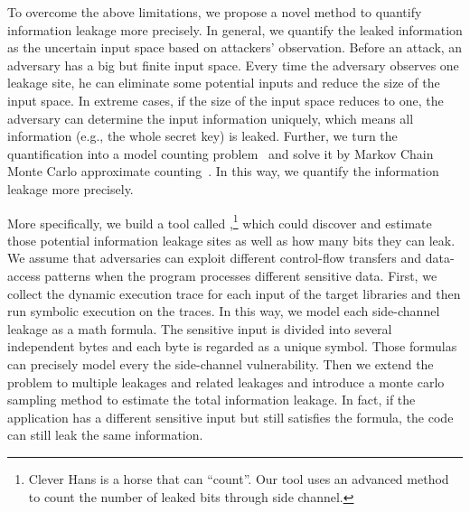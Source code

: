 To overcome the above limitations, we propose a novel method
to quantify information leakage more precisely. 
In general, we quantify the leaked information as the uncertain input space based on attackers' observation.
Before an attack, an adversary has a big but finite input space.
Every time the adversary observes one leakage site, he can eliminate some potential inputs and
reduce the size of the input space. 
In extreme cases, if the size of the input space reduces to one, 
the adversary can determine the input information uniquely, which means all information
(e.g., the whole secret key) is leaked. 
Further, we turn the quantification into a model counting problem~\cite{bibid} 
and solve it by Markov Chain Monte Carlo approximate counting~\cite{bibid}. 
In this way, we quantify the information leakage more precisely.


More specifically, we build a tool called \tool{},\footnote{Clever Hans is a horse that can ``count''.
Our tool uses an advanced method to count the number of leaked bits through side channel.}
which could discover and estimate those potential information leakage sites 
as well as how many bits they can leak. 
We assume that adversaries can exploit different control-flow transfers and data-access patterns when 
the program processes different sensitive data. 
First, we collect the dynamic execution trace for each input of the target libraries 
and then run symbolic execution on the traces. 
In this way, we model each side-channel leakage as a math formula. 
The sensitive input is divided into several independent bytes and each byte is regarded as 
a unique symbol. Those formulas can precisely model every the side-channel vulnerability.
Then we extend the problem to multiple leakages and related leakages
and introduce a monte carlo sampling method to estimate the total information leakage.
In fact, if the application has a different sensitive input but still satisfies the formula, 
the code can still leak the same information. 



